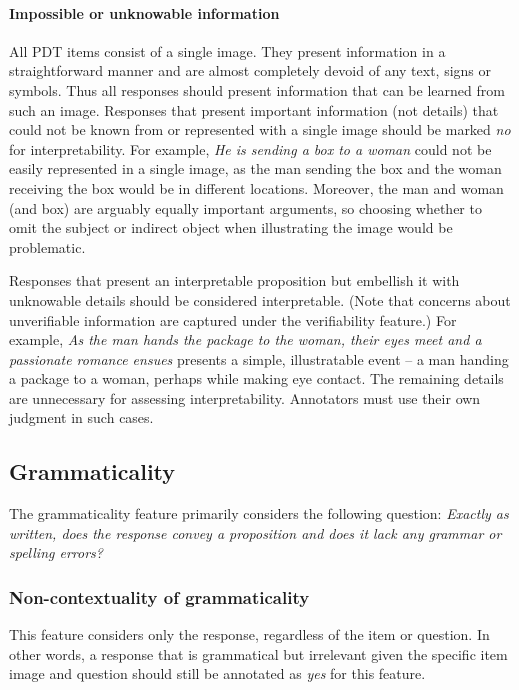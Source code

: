 \documentclass[12pt]{article}
\begin{document}
\paragraph{Impossible or unknowable information} All PDT items consist of a single image. They present information in a straightforward manner and are almost completely devoid of any text, signs or symbols. Thus all responses should present information that can be learned from such an image. Responses that present important information (not details) that could not be known from or represented with a single image should be marked \textit{no} for interpretability. For example, \textit{He is sending a box to a woman} could not be easily represented in a single image, as the man sending the box and the woman receiving the box would be in different locations. Moreover, the man and woman (and box) are arguably equally important arguments, so choosing whether to omit the subject or indirect object when illustrating the image would be problematic.

Responses that present an interpretable proposition but embellish it with unknowable details should be considered interpretable. (Note that concerns about unverifiable information are captured under the verifiability feature.) For example, \textit{As the man hands the package to the woman, their eyes meet and a passionate romance ensues} presents a simple, illustratable event -- a man handing a package to a woman, perhaps while making eye contact. The remaining details are unnecessary for assessing interpretability. Annotators must use their own judgment in such cases.


\subsection{Grammaticality} \label{subsec:grammaticality}
The grammaticality feature primarily considers the following question: \textit{Exactly as written, does the response convey a proposition and does it lack any grammar or spelling errors?}

\subsubsection{Non-contextuality of grammaticality} This feature considers only the response, regardless of the item or question. In other words, a response that is grammatical but  irrelevant given the specific item image and question should still be annotated as \textit{yes} for this feature.
\end{document}
